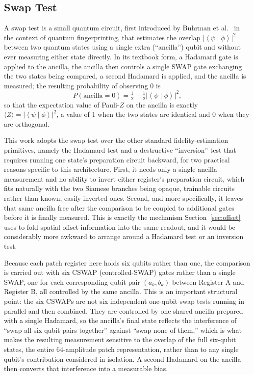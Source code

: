 \documentclass[conference]{IEEEtran}
\newcommand{\braket}[2]{\left\langle#1\middle|#2\right\rangle}
\begin{document}
\subsection{Swap Test}\label{sec:swaptest}
A swap test is a small quantum circuit, first introduced by Buhrman et al.~\cite{buhrman2001} in the context of quantum fingerprinting, that estimates the overlap $|\braket{\psi}{\phi}|^2$ between two quantum states using a single extra (``ancilla'') qubit and without ever measuring either state directly. In its textbook form, a Hadamard gate is applied to the ancilla, the ancilla then controls a single SWAP gate exchanging the two states being compared, a second Hadamard is applied, and the ancilla is measured; the resulting probability of observing 0 is
\begin{equation}
P(\text{ancilla}=0) = \tfrac{1}{2} + \tfrac{1}{2}\left|\braket{\psi}{\phi}\right|^2,
\label{eq:swap}
\end{equation}
so that the expectation value of Pauli-$Z$ on the ancilla is exactly $\langle Z\rangle = |\braket{\psi}{\phi}|^2$, a value of 1 when the two states are identical and 0 when they are orthogonal.

This work adopts the swap test over the other standard fidelity-estimation primitives, namely the Hadamard test and a destructive ``inversion'' test that requires running one state's preparation circuit backward, for two practical reasons specific to this architecture. First, it needs only a single ancilla measurement and no ability to invert either register's preparation circuit, which fits naturally with the two Siamese branches being opaque, trainable circuits rather than known, easily-inverted ones. Second, and more specifically, it leaves that same ancilla free after the comparison to be coupled to additional gates before it is finally measured. This is exactly the mechanism Section~\ref{sec:offset} uses to fold spatial-offset information into the same readout, and it would be considerably more awkward to arrange around a Hadamard test or an inversion test.

Because each patch register here holds six qubits rather than one, the comparison is carried out with six CSWAP (controlled-SWAP) gates rather than a single SWAP, one for each corresponding qubit pair $(a_k, b_k)$ between Register A and Register B, all controlled by the same ancilla. This is an important structural point: the six CSWAPs are not six independent one-qubit swap tests running in parallel and then combined. They are controlled by one shared ancilla prepared with a single Hadamard, so the ancilla's final state reflects the interference of ``swap all six qubit pairs together'' against ``swap none of them,'' which is what makes the resulting measurement sensitive to the overlap of the full six-qubit states, the entire 64-amplitude patch representation, rather than to any single qubit's contribution considered in isolation. A second Hadamard on the ancilla then converts that interference into a measurable bias.
\end{document}
